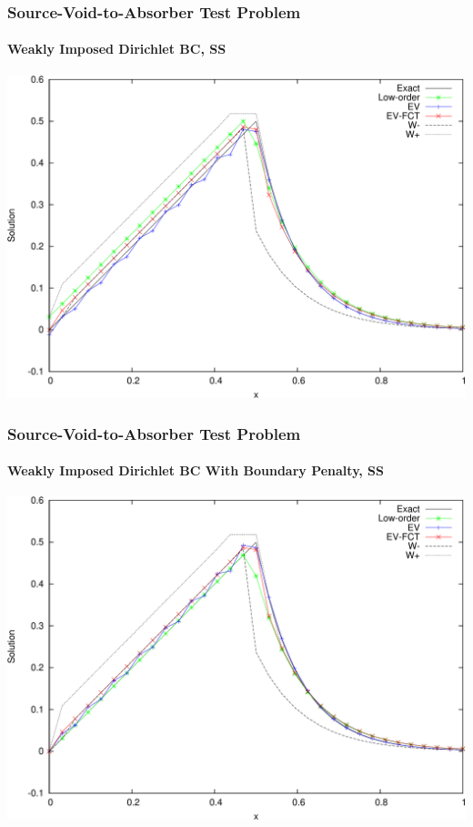 \begin{frame}
\frametitle{Source-Void-to-Absorber Test Problem}
\framesubtitle{Weakly Imposed Dirichlet BC, SS}

\begin{center}
\includegraphics[height=0.8\textheight]{./figures/sourcevoid_weak.pdf}
\end{center}

\end{frame}
\begin{frame}
\frametitle{Source-Void-to-Absorber Test Problem}
\framesubtitle{Weakly Imposed Dirichlet BC With Boundary Penalty, SS}

\begin{center}
\includegraphics[height=0.8\textheight]{./figures/sourcevoid_penalty.pdf}
\end{center}

\end{frame}
